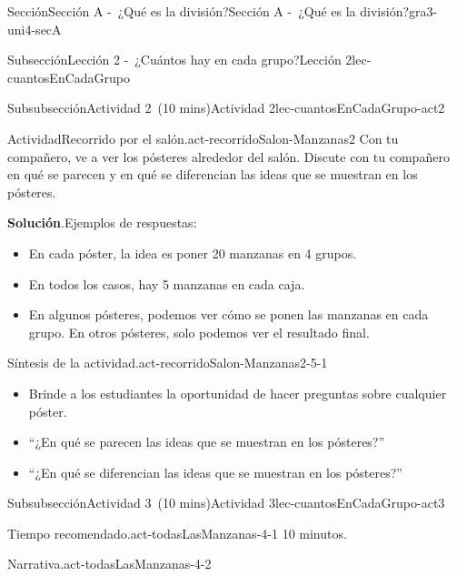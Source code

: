 \documentclass[oneside,10pt,]{article}
\newcommand{\blocktitlefont}{\relax}
\begin{document}
\begin{sectionptx}{Sección}{Sección A -~¿Qué es la división?}{}{Sección A -~¿Qué es la división?}{}{}{gra3-uni4-secA}
\begin{subsectionptx}{Subsección}{Lección 2 -~¿Cuántos hay en cada grupo?}{}{Lección 2}{}{}{lec-cuantosEnCadaGrupo}
\begin{subsubsectionptx}{Subsubsección}{Actividad 2~(10 mins)}{}{Actividad 2}{}{}{lec-cuantosEnCadaGrupo-act2}
\begin{activity}{Actividad}{Recorrido por el salón.}{act-recorridoSalon-Manzanas2}
Con tu compañero, ve a ver los pósteres alrededor del salón. Discute con tu compañero en qué se parecen y en qué se diferencian las ideas que se muestran en los pósteres.%
\par\smallskip%
\noindent\textbf{\blocktitlefont Solución}.\hypertarget{act-recorridoSalon-Manzanas2-3}{}\quad{}Ejemplos de respuestas:%
%
\begin{itemize}[label=\textbullet]
\item{}En cada póster, la idea es poner 20 manzanas en 4 grupos.%
\item{}En todos los casos, hay 5 manzanas en cada caja.%
\item{}En algunos pósteres, podemos ver cómo se ponen las manzanas en cada grupo. En otros pósteres, solo podemos ver el resultado final.%
\end{itemize}
\end{activity}%
\par
\begin{paragraphs}{Síntesis de la actividad.}{act-recorridoSalon-Manzanas2-5-1}%
%
\begin{itemize}[label=\textbullet]
\item{}Brinde a los estudiantes la oportunidad de hacer preguntas sobre cualquier póster.%
\item{}``¿En qué se parecen las ideas que se muestran en los pósteres?''%
\item{}``¿En qué se diferencian las ideas que se muestran en los pósteres?''%
\end{itemize}
\end{paragraphs}%
\end{subsubsectionptx}
%
%
\typeout{************************************************}
\typeout{************************************************}
%
\begin{subsubsectionptx}{Subsubsección}{Actividad 3~(10 mins)}{}{Actividad 3}{}{}{lec-cuantosEnCadaGrupo-act3}
\par
\begin{paragraphs}{Tiempo recomendado.}{act-todasLasManzanas-4-1}%
10 minutos.%
\end{paragraphs}%
\begin{paragraphs}{Narrativa.}{act-todasLasManzanas-4-2}%

\end{paragraphs}
\end{subsubsectionptx}
\end{subsectionptx}
\end{sectionptx}
\end{document}
